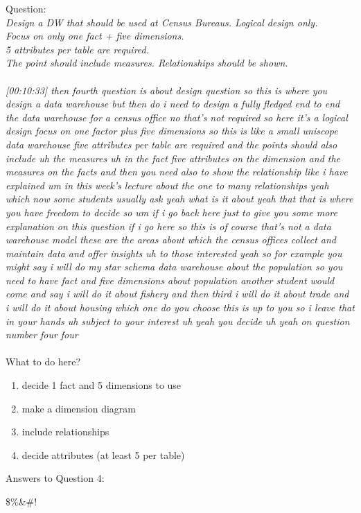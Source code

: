 Question:\\
\emph{
    Design a DW that should be used at Census Bureaus. Logical design only.\\ Focus on only
one fact + five dimensions.\\ 5 attributes per table are required.\\ The point should include
measures. Relationships should be shown.
}\\\\
\emph{[00:10:33] then fourth question is about design question so this is where you design a data warehouse but then do i need to design a fully
fledged end to end the data warehouse for a census office no that's not required so here it's a logical
design focus on one factor plus five dimensions so this is like a small uniscope data warehouse five
attributes per table are required and the points should also include uh the measures uh in the fact
five attributes on the dimension and the measures on the facts and then you need also to show the
relationship like i have explained um in this week's lecture about the one to many relationships
yeah which now some students usually ask yeah what is it about yeah that that is where you have freedom
to decide so um if i go back here just to give you some more explanation on this question if i go here
so this is of course that's not a data warehouse model these are the areas about which the census offices
collect and maintain data and offer insights uh to those interested yeah so for example you might
say i will do my star schema data warehouse about the population so you need to have
fact and five dimensions about population another student would come and say i will do it about fishery and
then third i will do it about trade and i will do it about housing which one do you choose this is up to you
so i leave that in your hands uh subject to your interest uh yeah you decide uh yeah on question number four
four}\\\\
What to do here?
\begin{enumerate}
    \item decide 1 fact and 5 dimensions to use
    \item make a dimension diagram
    \item include relationships
    \item decide attributes (at least 5 per table)
  \end{enumerate}

\newpage Answers to Question 4:

\newpage 
\$\%\&\#!